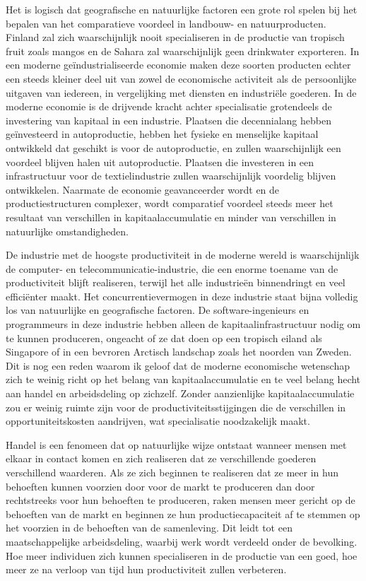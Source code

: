 Het is logisch dat geografische en natuurlijke factoren een grote rol spelen bij het bepalen van het comparatieve voordeel in landbouw- en natuurproducten. Finland zal zich waarschijnlijk nooit specialiseren in de productie van tropisch fruit zoals mango\textquotesingle s en de Sahara zal waarschijnlijk geen drinkwater exporteren. In een moderne geïndustrialiseerde economie maken deze soorten producten echter een steeds kleiner deel uit van zowel de economische activiteit als de persoonlijke uitgaven van iedereen, in vergelijking met diensten en industriële goederen. In de moderne economie is de drijvende kracht achter specialisatie grotendeels de investering van kapitaal in een industrie. Plaatsen die decennialang hebben geïnvesteerd in autoproductie, hebben het fysieke en menselijke kapitaal ontwikkeld dat geschikt is voor de autoproductie, en zullen waarschijnlijk een voordeel blijven halen uit autoproductie. Plaatsen die investeren in een infrastructuur voor de textielindustrie zullen waarschijnlijk voordelig blijven ontwikkelen. Naarmate de economie geavanceerder wordt en de productiestructuren complexer, wordt comparatief voordeel steeds meer het resultaat van verschillen in kapitaalaccumulatie en minder van verschillen in natuurlijke omstandigheden.

De industrie met de hoogste productiviteit in de moderne wereld is waarschijnlijk de computer- en telecommunicatie-industrie, die een enorme toename van de productiviteit blijft realiseren, terwijl het alle industrieën binnendringt en veel efficiënter maakt. Het concurrentievermogen in deze industrie staat bijna volledig los van natuurlijke en geografische factoren. De software-ingenieurs en programmeurs in deze industrie hebben alleen de kapitaalinfrastructuur nodig om te kunnen produceren, ongeacht of ze dat doen op een tropisch eiland als Singapore of in een bevroren Arctisch landschap zoals het noorden van Zweden. Dit is nog een reden waarom ik geloof dat de moderne economische wetenschap zich te weinig richt op het belang van kapitaalaccumulatie en te veel belang hecht aan handel en arbeidsdeling op zichzelf. Zonder aanzienlijke kapitaalaccumulatie zou er weinig ruimte zijn voor de productiviteitsstijgingen die de verschillen in opportuniteitskosten aandrijven, wat specialisatie noodzakelijk maakt.

Handel is een fenomeen dat op natuurlijke wijze ontstaat wanneer mensen met elkaar in contact komen en zich realiseren dat ze verschillende goederen verschillend waarderen. Als ze zich beginnen te realiseren dat ze meer in hun behoeften kunnen voorzien door voor de markt te produceren dan door rechtstreeks voor hun behoeften te produceren, raken mensen meer gericht op de behoeften van de markt en beginnen ze hun productiecapaciteit af te stemmen op het voorzien in de behoeften van de samenleving. Dit leidt tot een maatschappelijke arbeidsdeling, waarbij werk wordt verdeeld onder de bevolking. Hoe meer individuen zich kunnen specialiseren in de productie van een goed, hoe meer ze na verloop van tijd hun productiviteit zullen verbeteren.


